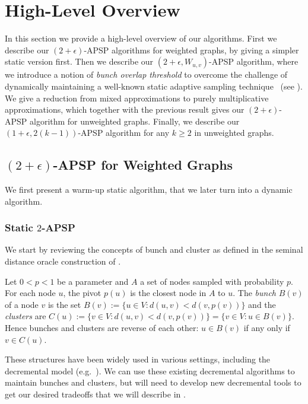 \section{High-Level Overview}
 In this section we provide a high-level overview of our algorithms. First we describe our $(2+\epsilon)$-APSP algorithms for weighted graphs, by giving a simpler static version first. Then we describe our $(2+\epsilon,W_{u,v})$-APSP algorithm, where we introduce a notion of \emph{bunch overlap threshold} to overcome the challenge of dynamically maintaining a well-known static adaptive sampling technique~\cite{TZ01} (see ). 
 We give a reduction from mixed approximations to purely multiplicative approximations, which together with the previous result gives our $(2+\epsilon)$-APSP algorithm for unweighted graphs. 
Finally, we describe our $(1+\epsilon, 2(k-1))$-APSP algorithm for any $k \geq 2$ in unweighted graphs. 



\subsection{\texorpdfstring{$(2+\epsilon)$}{(2+epsilon)}-APSP for Weighted Graphs}\label{sc:high-level_2approx} 
We first present a warm-up static algorithm, that we later turn into a dynamic algorithm. 

\subsubsection{Static \texorpdfstring{$2$}{2}-APSP} 
We start by reviewing the concepts of bunch and cluster as defined in the seminal distance oracle construction of \cite{TZ2005}.

Let $0<p <1$ be a parameter and $A$ a set of nodes sampled with probability $p$. For each node $u$, the pivot $p(u)$ is the closest node in $A$ to $u$. The \textit{bunch} $B(v)$ of a node $v$ is the set $B(v):=\{ u \in V : d(u,v) < d(v,p(v)) \}$ and the \textit{clusters} are $C(u):= \{ v \in V: d(u,v) < d(v,p(v)) \}=\{v \in V: u\in B(v)\}$. Hence bunches and clusters are reverse of each other: $u \in B(v)$ if any only if $v \in C(u)$.

 These structures have been widely used in various settings, including the decremental model (e.g.~\cite{HKN2016, RodittyZ11, LN2020, Chechik18}). We can use these existing decremental algorithms to maintain bunches and clusters, but will need to develop new decremental tools to get our desired tradeoffs that we will describe in .


